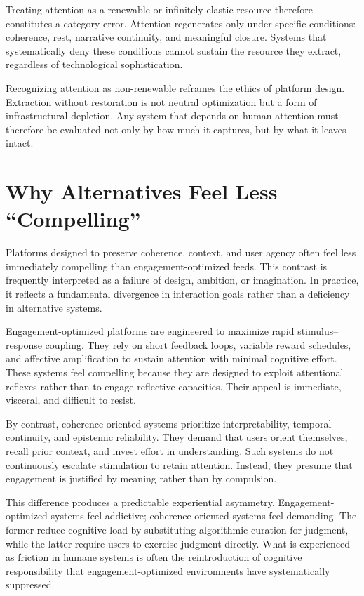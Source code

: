 \documentclass[12pt]{article}
\begin{document}
Treating attention as a renewable or infinitely elastic resource therefore constitutes a category error. Attention regenerates only under specific conditions: coherence, rest, narrative continuity, and meaningful closure. Systems that systematically deny these conditions cannot sustain the resource they extract, regardless of technological sophistication.

Recognizing attention as non-renewable reframes the ethics of platform design. Extraction without restoration is not neutral optimization but a form of infrastructural depletion. Any system that depends on human attention must therefore be evaluated not only by how much it captures, but by what it leaves intact.

\section{Why Alternatives Feel Less ``Compelling''}

Platforms designed to preserve coherence, context, and user agency often feel less immediately compelling than engagement-optimized feeds. This contrast is frequently interpreted as a failure of design, ambition, or imagination. In practice, it reflects a fundamental divergence in interaction goals rather than a deficiency in alternative systems.

Engagement-optimized platforms are engineered to maximize rapid stimulus--response coupling. They rely on short feedback loops, variable reward schedules, and affective amplification to sustain attention with minimal cognitive effort. These systems feel compelling because they are designed to exploit attentional reflexes rather than to engage reflective capacities. Their appeal is immediate, visceral, and difficult to resist.

By contrast, coherence-oriented systems prioritize interpretability, temporal continuity, and epistemic reliability. They demand that users orient themselves, recall prior context, and invest effort in understanding. Such systems do not continuously escalate stimulation to retain attention. Instead, they presume that engagement is justified by meaning rather than by compulsion.

This difference produces a predictable experiential asymmetry. Engagement-optimized systems feel addictive; coherence-oriented systems feel demanding. The former reduce cognitive load by substituting algorithmic curation for judgment, while the latter require users to exercise judgment directly. What is experienced as friction in humane systems is often the reintroduction of cognitive responsibility that engagement-optimized environments have systematically suppressed.
\end{document}
